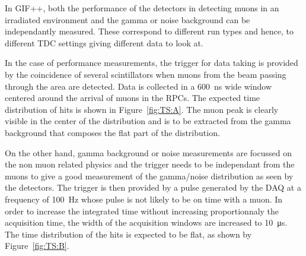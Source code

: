 	In GIF++, both the performance of the detectors in detecting muons in an irradiated environment and the gamma or noise background can be independantly measured. These correspond to different run types and hence, to different TDC settings giving different data to look at.
	
	In the case of performance measurements, the trigger for data taking is provided by the coincidence of several scintillators when muons from the beam passing through the area are detected. Data is collected in a \SI{600}{ns} wide window centered around the arrival of muons in the RPCs. The expected time distribution of hits is shown in Figure~\ref{fig:TS:A}. The muon peak is clearly visible in the center of the distribution and is to be extracted from the gamma background that composes the flat part of the distribution.
	
	On the other hand, gamma background or noise measurements are focussed on the non muon related physics and the trigger needs to be independant from the muons to give a good measurement of the gamma/noise distribution as seen by the detectors. The trigger is then provided by a pulse generated by the DAQ at a frequency of \SI{100}{Hz} whose pulse is not likely to be on time with a muon. In order to increase the integrated time without increasing proportionnaly the acquisition time, the width of the acquisition windows are increased to \SI{10}{\micro s}. The time distribution of the hits is expected to be flat, as shown by Figure~\ref{fig:TS:B}.
	
